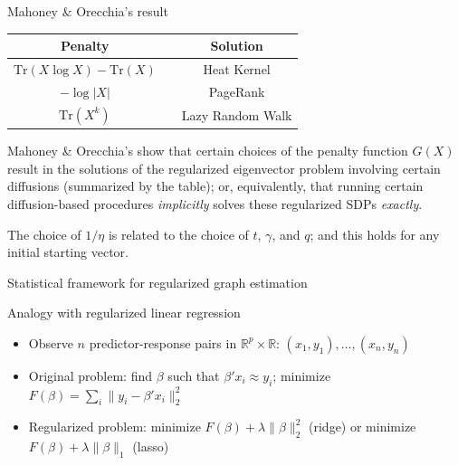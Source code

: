 \documentclass[xcolor=dvipsnames]{beamer}
\begin{document}
\begin{frame}
  \begin{block}{Mahoney \& Orecchia's result}
    \centering
    \begin{tabular}{ccc}
      Penalty &\phantom{MMM} & Solution \\
      \hline
      $\mathrm{Tr}(X \log X) - \mathrm{Tr}(X)$ && Heat Kernel \\
      $- \log |X|$ && PageRank  \\
      $\mathrm{Tr}(X^k)$ && Lazy Random Walk
    \end{tabular}
  \end{block}
  Mahoney \& Orecchia's show that certain choices of the penalty function 
  $G(X)$ result in the solutions of the regularized eigenvector problem 
  involving certain diffusions (summarized by the table); or, equivalently, 
  that running certain diffusion-based procedures \emph{implicitly} solves
  these regularized SDPs \emph{exactly}.

  The choice of $1/\eta$ is related to the choice of $t$, $\gamma$, and $q$; 
  and this holds for any initial starting vector.

\end{frame}


\begin{frame}
  \begin{block}{}
  \begin{center}
    \huge{Statistical framework for regularized graph estimation}
  \end{center}
  \end{block}
\end{frame}

\begin{frame}
  \begin{block}{Analogy with regularized linear regression}
  \begin{itemize}
    \item Observe $n$ predictor-response pairs in $\mathbb{R}^p \times \mathbb{R}$:
      $(x_1, y_1), \dotsc, (x_n, y_n)$
    \item Original problem: find $\beta$ such that $\beta' x_i \approx y_i$; minimize $F(\beta) =
    \sum_i \|y_i - \beta' x_i \|_2^2$
    \item Regularized problem: minimize $F(\beta) + \lambda \| \beta \|_2^2$
    (ridge) or minimize $F(\beta) + \lambda \| \beta \|_1$ (lasso)
  \end{itemize}
  \end{block}
\end{frame}
\end{document}
